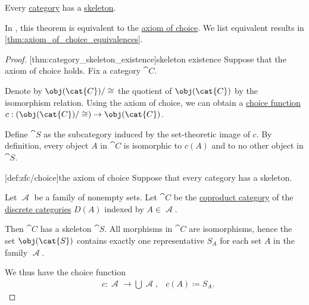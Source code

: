 \begin{theorem}\label{thm:category_skeleton_existence}
  Every \hyperref[def:category]{category} has a \hyperref[def:category_skeleton]{skeleton}.
\end{theorem}
\begin{comments}
  \item In \hyperref[def:zfc]{}, this theorem is equivalent to the \hyperref[def:zfc/choice]{axiom of choice}. We list equivalent results in \cref{thm:axiom_of_choice_equivalences}.
\end{comments}
\begin{proof}
  [thm:category_skeleton_existence]{skeleton existence} Suppose that the axiom of choice holds. Fix a category \( \cat{C} \).

  Denote by \( \obj(\cat{C}) / \cong \) the quotient of \( \obj(\cat{C}) \) by the isomorphism relation. Using the axiom of choice, we can obtain a \hyperref[def:choice_function]{choice function} \( c: (\obj(\cat{C}) / \cong) \to \obj(\cat{C}) \).

  Define \( \cat{S} \) as the subcategory induced by the set-theoretic image of \( c \). By definition, every object \( A \) in \( \cat{C} \) is isomorphic to \( c(A) \) and to no other object in \( \cat{S} \).

  [def:zfc/choice]{the axiom of choice} Suppose that every category has a skeleton.

  Let \( \mscrA \) be a family of nonempty sets. Let \( \cat{C} \) be the \hyperref[def:coproduct_category]{coproduct category} of the \hyperref[def:discrete_category]{discrete categories} \( D(A) \) indexed by \( A \in \mscrA \).

  Then \( \cat{C} \) has a skeleton \( \cat{S} \). All morphisms in \( \cat{C} \) are isomorphisms, hence the set \( \obj(\cat{S}) \) contains exactly one representative \( S_A \) for each set \( A \) in the family \( \mscrA \).

  We thus have the choice function
  \begin{equation*}
    \begin{aligned}
      &c: \mscrA \to \bigcup \mscrA,
      &c(A) \coloneqq S_A.
    \end{aligned}
  \end{equation*}
\end{proof}

